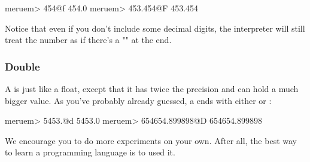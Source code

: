 \begin{REPL}
meruem> 454@f
454.0
meruem> 453.454@F
453.454
\end{REPL}

Notice that even if you don't include some decimal digits, the interpreter will still treat the number as if there's a "" at the end.

\subsubsection{Double}
A  is just like a float, except that it has twice the precision and can hold a much bigger value. As you've probably already guessed, a  ends with either  or :

\begin{REPL}
meruem> 5453.@d
5453.0
meruem> 654654.899898@D
654654.899898
\end{REPL}

We encourage you to do more experiments on your own. After all, the best way to learn a programming language is to used it.